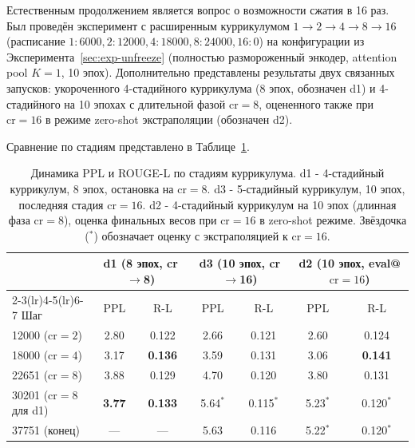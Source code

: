 \documentclass[a4paper,12pt]{extarticle}
\begin{document}
Естественным продолжением является вопрос о возможности сжатия в 16 раз. Был проведён эксперимент с расширенным куррикулумом $1 \to 2 \to 4 \to 8 \to 16$ (расписание $1{:}6000, 2{:}12000, 4{:}18000, 8{:}24000, 16{:}0$) на конфигурации из Эксперимента~\ref{sec:exp-unfreeze} (полностью размороженный энкодер, attention pool $K=1$, 10 эпох). Дополнительно представлены результаты двух связанных запусков: укороченного 4-стадийного куррикулума (8 эпох, обозначен d1) и 4-стадийного на 10 эпохах с длительной фазой $\text{cr}=8$, оцененного также при $\text{cr}=16$ в режиме zero-shot экстраполяции (обозначен d2).

Сравнение по стадиям представлено в Таблице~\ref{tab:exp-cr16}.

\begin{table}[ht]
\centering
\caption{Динамика PPL и ROUGE-L по стадиям куррикулума. d1 - 4-стадийный куррикулум, 8 эпох, остановка на $\text{cr}=8$. d3 - 5-стадийный куррикулум, 10 эпох, последняя стадия $\text{cr}=16$. d2 - 4-стадийный куррикулум на 10 эпох (длинная фаза $\text{cr}=8$), оценка финальных весов при $\text{cr}=16$ в zero-shot режиме. Звёздочка ($^{*}$) обозначает оценку с экстраполяцией к $\text{cr}=16$.}
\label{tab:exp-cr16}
\footnotesize
\begin{tabular}{lcccccc}
\toprule
& \multicolumn{2}{c}{d1 (8 эпох, cr$\to$8)} & \multicolumn{2}{c}{d3 (10 эпох, cr$\to$16)} & \multicolumn{2}{c}{d2 (10 эпох, eval@$\text{cr}=16$)} \\
\cmidrule(lr){2-3}\cmidrule(lr){4-5}\cmidrule(lr){6-7}
Шаг & PPL & R-L & PPL & R-L & PPL & R-L \\
\midrule
12000 ($\text{cr}=2$)           & 2.80           & 0.122          & 2.66           & 0.121          & 2.60           & 0.124 \\
18000 ($\text{cr}=4$)           & 3.17           & \textbf{0.136} & 3.59           & 0.131          & 3.06           & \textbf{0.141} \\
22651 ($\text{cr}=8$)           & 3.88           & 0.129          & 4.70           & 0.120          & 3.80           & 0.131 \\
30201 ($\text{cr}=8$ для d1)    & \textbf{3.77}  & \textbf{0.133} & 5.64$^{*}$     & 0.115$^{*}$    & 5.23$^{*}$     & 0.120$^{*}$ \\
37751 (конец)                   & ---            & ---            & 5.63           & 0.116          & 5.22$^{*}$     & 0.120$^{*}$ \\
\bottomrule
\end{tabular}
\end{table}
\end{document}

